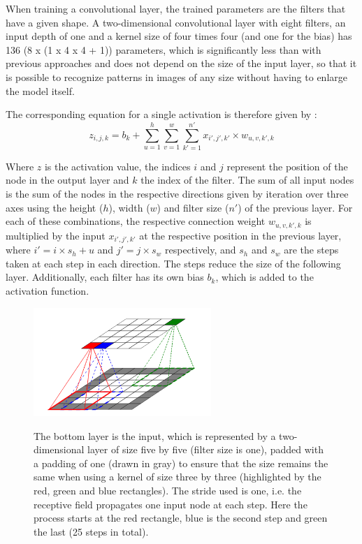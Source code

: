 When training a convolutional layer, the trained parameters are the filters that have a given shape.
A two-dimensional convolutional layer with eight filters, an input depth of one and a kernel size of four times four (and one for the bias) has 136 (8 x (1 x 4 x 4 + 1)) parameters, which is significantly less than with previous approaches and does not depend on the size of the input layer, so that it is possible to recognize patterns in images of any size without having to enlarge the model itself.

The corresponding equation for a single activation is therefore given by \cite [p. 453]{Geron2019}:
\begin{equation}
z_{i,j,k} = b_k + \sum_{u=1}^{h} \sum_{v=1}^{w} \sum_{k'=1}^{n'} x_{i', j', k'} \times w_{u, v, k', k} 
\end{equation}

Where $z$ is the activation value, the indices $i$ and $j$ represent the position of the node in the output layer and $k$ the index of the filter.
The sum of all input nodes is the sum of the nodes in the respective directions given by iteration over three axes using the height ($h$), width ($w$) and filter size ($n'$) of the previous layer.
For each of these combinations, the respective connection weight $w_{u, v, k', k}$ is multiplied by the input $x_{i', j', k'}$ at the respective position in the previous layer, where $i' = i \times s_h + u$ and $j' = j \times s_w$ respectively, and $s_h$ and $s_w$ are the steps taken at each step in each direction.
The steps reduce the size of the following layer.
Additionally, each filter has its own bias $b_k$, which is added to the activation function.

\begin{figure}
    \centering
    \caption[Convolutional layer]{ The bottom layer is the input, which is represented by a two-dimensional layer of size five by five (filter size is one), padded with a padding of one (drawn in gray) to ensure that the size remains the same when using a kernel of size three by three (highlighted by the red, green and blue rectangles). The stride used is one, i.e. the receptive field propagates one input node at each step. Here the process starts at the red rectangle, blue is the second step and green the last (25 steps in total). }
    \includegraphics[width=0.6\textwidth]{images/conv_layer.png}
    \label{fig:conv_layer}
\end{figure}

